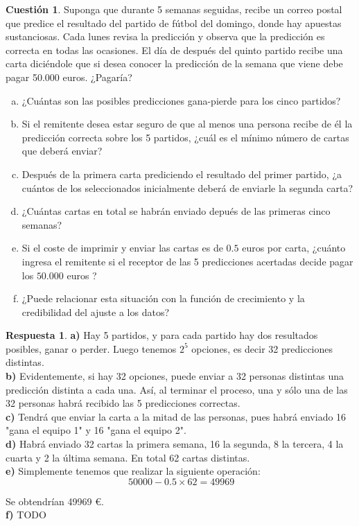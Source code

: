 \documentclass[10pt,a4paper]{article}
\theoremstyle{definition}
\newtheorem{cuestion}{Cuestión}
\newtheorem*{respuesta}{Respuesta}
\begin{document}
\begin{cuestion}
Suponga que durante 5 semanas seguidas, recibe un correo postal que predice el resultado del partido de fútbol del domingo, donde hay apuestas sustanciosas. Cada lunes revisa la predicción y observa que la predicción es correcta en todas las ocasiones. El día de después del quinto partido recibe una carta diciéndole que si desea conocer la predicción de la semana que viene debe pagar 50.000 euros. ¿Pagaría?
\begin{enumerate}[a)]
\item ¿Cuántas son las posibles predicciones gana-pierde para los cinco partidos?
\item Si el remitente desea estar seguro de que al menos una persona recibe de él la predicción correcta sobre los 5 partidos, ¿cuál es el mínimo número de cartas que deberá enviar?
\item Después de la primera carta prediciendo el resultado del primer partido, ¿a cuántos de los seleccionados inicialmente deberá de enviarle la segunda carta?
\item ¿Cuántas cartas en total se habrán enviado depués de las primeras cinco semanas?
\item  Si el coste de imprimir y enviar las cartas es de $0.5$ euros por carta, ¿cuánto ingresa el remitente si el receptor de las 5 predicciones acertadas decide pagar los $50.000$ euros ?
\item ¿Puede relacionar esta situación con la función de crecimiento y la credibilidad del ajuste a los datos?
\end{enumerate}
\end{cuestion}
\begin{respuesta}
\textbf{a)}
Hay 5 partidos, y para cada partido hay dos resultados posibles, ganar o perder. Luego tenemos $2^5$ opciones, es decir 32 predicciones distintas.\\

\textbf{b)}
Evidentemente, si hay 32 opciones, puede enviar a 32 personas distintas una predicción distinta a cada una. Así, al terminar el proceso, una y sólo una de las 32 personas habrá recibido las 5 predicciones correctas.\\

\textbf{c)}
Tendrá que enviar la carta a la mitad de las personas, pues habrá enviado 16 "gana el equipo 1" y 16 "gana el equipo 2".\\

\textbf{d)}
Habrá enviado 32 cartas la primera semana, 16 la segunda, 8 la tercera, 4 la cuarta y 2 la última semana. En total 62 cartas distintas.\\

\textbf{e)}
Simplemente tenemos que realizar la siguiente operación:\\

\[
\ 50000 - 0.5 \times 62 = 49969
\]

Se obtendrían 49969 \euro.\\

\textbf{f)}
TODO\\

\end{respuesta}
\end{document}
